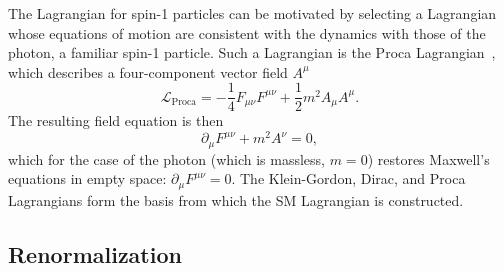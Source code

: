 The Lagrangian for spin-1 particles can be motivated by selecting a Lagrangian whose equations of motion are consistent with the dynamics with those of the photon, a familiar spin-1 particle.
Such a Lagrangian is the Proca Lagrangian~\cite{Griffiths:2008zz}, which describes a four-component vector field $A^\mu$
\begin{equation} \label{eqn:proca_lagrangian}
    \mathcal L_{\text{Proca}} = -\frac{1}{4} F_{\mu \nu}F^{\mu \nu} + \frac{1}{2} m^2 A_\mu A^\mu.
\end{equation}
The resulting field equation is then~\cite{Griffiths:2008zz}
\begin{equation}
    \partial_\mu F^{\mu\nu} + m^2A^\nu = 0,
\end{equation}
which for the case of the photon (which is massless, $m=0$) restores Maxwell's equations in empty space: $\partial_\mu F^{\mu\nu} = 0$.
The Klein-Gordon, Dirac, and Proca Lagrangians form the basis from which the SM Lagrangian is constructed.

\subsection{Renormalization}

